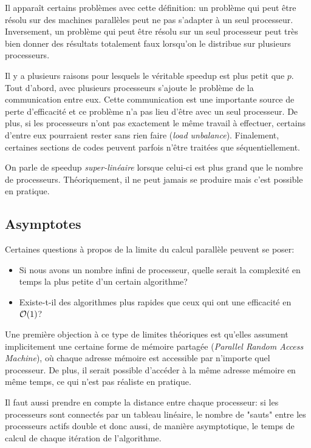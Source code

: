 	Il apparaît certains problèmes avec cette définition: un problème qui peut être résolu sur des machines parallèles peut ne pas s'adapter à un seul processeur. Inversement, un problème qui peut être résolu sur un seul processeur peut très bien donner des résultats totalement faux lorsqu'on le distribue sur plusieurs processeurs.
	
	Il y a plusieurs raisons pour lesquels le véritable speedup est plus petit que $p$. Tout d'abord, avec plusieurs processeurs s'ajoute le problème de la communication entre eux. Cette communication est une importante source de perte d'efficacité et ce problème n'a pas lieu d'être avec un seul processeur. De plus, si les processeurs n'ont pas exactement le même travail à effectuer, certains d'entre eux pourraient rester sans rien faire (\textit{load unbalance}). Finalement, certaines sections de codes peuvent parfois n'être traitées que séquentiellement.
	
	On parle de speedup \textit{super-linéaire} lorsque celui-ci est plus grand que le nombre de processeurs. Théoriquement, il ne peut jamais se produire mais c'est possible en pratique.
	
	\subsection{Asymptotes}
	Certaines questions à propos de la limite du calcul parallèle peuvent se poser:
	\begin{itemize}
	\item Si nous avons un nombre infini de processeur, quelle serait la complexité en temps la plus petite d'un certain algorithme?
	\item Existe-t-il des algorithmes plus rapides que ceux qui ont une efficacité en $\mathcal{O} (1)$?
	\end{itemize}
	Une première objection à ce type de limites théoriques est qu'elles assument implicitement une certaine forme de mémoire partagée (\textit{Parallel Random Access Machine}), où chaque adresse mémoire est accessible par n'importe quel processeur. De plus, il serait possible d'accéder à la même adresse mémoire en même temps, ce qui n'est pas réaliste en pratique.
	
	Il faut aussi prendre en compte la distance entre chaque processeur: si les processeurs sont connectés par un tableau linéaire, le nombre de "sauts" entre les processeurs actifs double et donc aussi, de manière asymptotique, le temps de calcul de chaque itération de l'algorithme.
	

